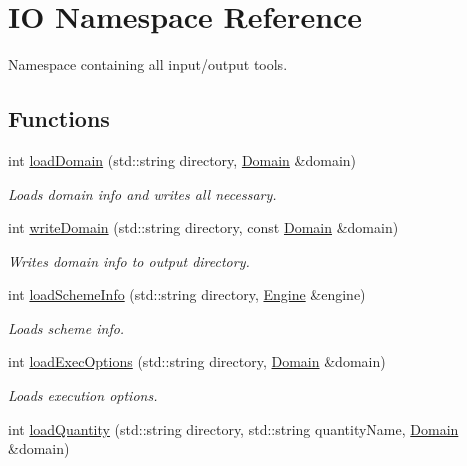 \hypertarget{namespaceIO}{
\section{IO Namespace Reference}
\label{namespaceIO}
}


Namespace containing all input/output tools.  
\subsection*{Functions}
\begin{DoxyCompactItemize}
\item 
int \hyperlink{namespaceIO_a418e0be241e707d7d99718c3a1dacf6b}{loadDomain} (std::string directory, \hyperlink{classDomain}{Domain} \&domain)
\begin{DoxyCompactList}\small\item\em Loads domain info and writes all necessary. \item\end{DoxyCompactList}\item 
int \hyperlink{namespaceIO_a63332902621fd10f3117978585af8a27}{writeDomain} (std::string directory, const \hyperlink{classDomain}{Domain} \&domain)
\begin{DoxyCompactList}\small\item\em Writes domain info to output directory. \item\end{DoxyCompactList}\item 
int \hyperlink{namespaceIO_acc60681d98975d0ce0d3580de4f70ecd}{loadSchemeInfo} (std::string directory, \hyperlink{classEngine}{Engine} \&engine)
\begin{DoxyCompactList}\small\item\em Loads scheme info. \item\end{DoxyCompactList}\item 
int \hyperlink{namespaceIO_ae9baa8f2d704798ba4b669718c5630c6}{loadExecOptions} (std::string directory, \hyperlink{classDomain}{Domain} \&domain)
\begin{DoxyCompactList}\small\item\em Loads execution options. \item\end{DoxyCompactList}\item 
int \hyperlink{namespaceIO_a0b5a994855e5e391320a431095d66400}{loadQuantity} (std::string directory, std::string quantityName, \hyperlink{classDomain}{Domain} \&domain)

\end{DoxyCompactItemize}
